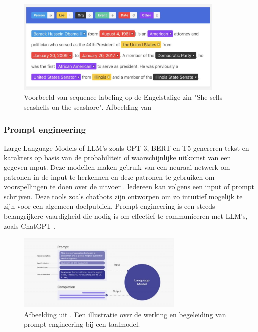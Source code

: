 \begin{figure}[H]
	\begin{center}
		\includegraphics[width=10cm]{img/nerlabeling.jpg}
	\end{center}
	\caption{Voorbeeld van sequence labeling op de Engelstalige zin "She sells seashells on the seashore". Afbeelding van \textcite{Bilisci2021} }
	\label{fig:ner}
\end{figure}


\subsubsection{Prompt engineering}

Large Language Models of LLM's zoals GPT-3, BERT en T5 genereren tekst en karakters op basis van de probabiliteit of waarschijnlijke uitkomst van een gegeven input. Deze modellen maken gebruik van een neuraal netwerk om patronen in de input te herkennen en deze patronen te gebruiken om voorspellingen te doen over de uitvoer \autocite{Liu2020}. Iedereen kan volgens \textcite{McFarland2023} een input of prompt schrijven. Deze tools zoals chatbots zijn ontworpen om zo intuïtief mogelijk te zijn voor een algemeen doelpubliek. Prompt engineering is een steeds belangrijkere vaardigheid die nodig is om effectief te communiceren met LLM’s, zoals ChatGPT \autocite{Harwell2023}.

\begin{figure}
	\begin{center}
			\includegraphics[width=8cm]{img/prompt-engineering-medium.png}
	\end{center}
	\caption{Afbeelding uit \textcite{McFarland2023}. Een illustratie over de werking en begeleiding van prompt engineering bij een taalmodel. }
\end{figure}

